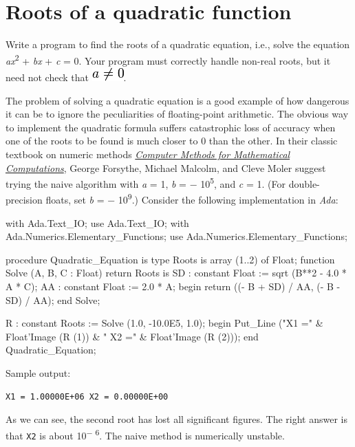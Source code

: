 \pagebreak{}
\section*{Roots of a quadratic function}

Write a program to find the roots of a quadratic equation, i.e., solve
the equation \emph{a}\emph{x}\textsuperscript{2} + \emph{b}\emph{x} +
\emph{c} = 0. Your program must correctly handle non-real roots, but it
need not check that
\includegraphics[scale=.6]{graphics/df44347863ac17dc898a13f44f681d01.png}.

The problem of solving a quadratic equation is a good example of how
dangerous it can be to ignore the peculiarities of floating-point
arithmetic. The obvious way to implement the quadratic formula suffers
catastrophic loss of accuracy when one of the roots to be found is much
closer to 0 than the other. In their classic textbook on numeric methods
\emph{\href{http://www.pdas.com/fmm.htm}{Computer Methods for
Mathematical Computations}}, George Forsythe, Michael Malcolm, and Cleve
Moler suggest trying the naive algorithm with \emph{a} = 1, \emph{b} = −
10\textsuperscript{5}, and \emph{c} = 1. (For double-precision floats,
set \emph{b} = − 10\textsuperscript{9}.) Consider the following
implementation in \emph{Ada}:

\begin{wideverbatim}
with Ada.Text_IO;                        use Ada.Text_IO;
with Ada.Numerics.Elementary_Functions;  use Ada.Numerics.Elementary_Functions;
 
procedure Quadratic_Equation is
   type Roots is array (1..2) of Float;
   function Solve (A, B, C : Float) return Roots is
      SD : constant Float := sqrt (B**2 - 4.0 * A * C);
      AA : constant Float := 2.0 * A;
   begin
      return ((- B + SD) / AA, (- B - SD) / AA);
   end Solve;
 
   R : constant Roots := Solve (1.0, -10.0E5, 1.0);
begin
   Put_Line ("X1 =" & Float'Image (R (1)) & " X2 =" & Float'Image (R (2)));
end Quadratic_Equation;
\end{wideverbatim}

Sample output:

\begin{verbatim}
X1 = 1.00000E+06 X2 = 0.00000E+00
\end{verbatim}

As we can see, the second root has lost all significant figures. The
right answer is that \texttt{X2} is about 10\textsuperscript{− 6}. The
naive method is numerically unstable.

